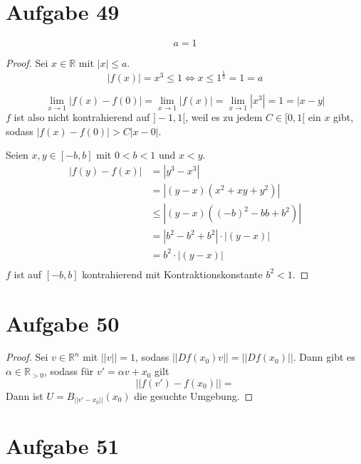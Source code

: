 \documentclass[10pt,a4paper]{article}
\begin{document}
\section*{Aufgabe 49}

\begin{equation}
a = 1
\end{equation}

\begin{proof}
Sei $x \in \mathbb{R}$ mit $|x| \le a$.
\begin{equation}
|f(x)| = x^{3} \le 1 \Leftrightarrow x \le 1^{\frac{1}{3}} = 1 = a
\end{equation}

\begin{equation}
\lim_{x \rightarrow 1} |f(x) - f(0)| = \lim_{x \rightarrow 1} |f(x)| = \lim_{x \rightarrow 1} |x^{3}| = 1 = |x - y|
\end{equation}
$f$ ist also nicht kontrahierend auf $]-1, 1[$, weil es zu jedem $C \in [0, 1[$ ein $x$ gibt, sodass $|f(x) - f(0)| > C|x - 0|$.

Seien $x, y \in [-b, b]$ mit $0 < b < 1$ und $x < y$.
\begin{align*}
|f(y) - f(x)| & = |y^{3} - x^{3}|\\
& = |(y - x)(x^{2} + xy + y^{2})|\\
& \le |(y - x)((-b)^{2} - bb + b^{2})|\\
& = |b^{2} - b^{2} + b^{2}| \cdot |(y - x)|\\
& = b^{2} \cdot |(y - x)|\\
\end{align*}
$f$ ist auf $[-b, b]$ kontrahierend mit Kontraktionskonstante $b^{2} < 1$.
\end{proof}

\section*{Aufgabe 50}

\begin{proof}
Sei $v \in \mathbb{R}^{n}$ mit $||v|| = 1$, sodass $||Df(x_{0})v|| = ||Df(x_{0})||$.
Dann gibt es $\alpha \in \mathbb{R}_{> 0}$, sodass für $v' = \alpha v + x_{0}$ gilt
\begin{equation}
||f(v') - f(x_{0})|| = 
\end{equation}
Dann ist $U = B_{||v' - x_{0}||}(x_{0})$ die gesuchte Umgebung.
\end{proof}

\section*{Aufgabe 51}
\end{document}
